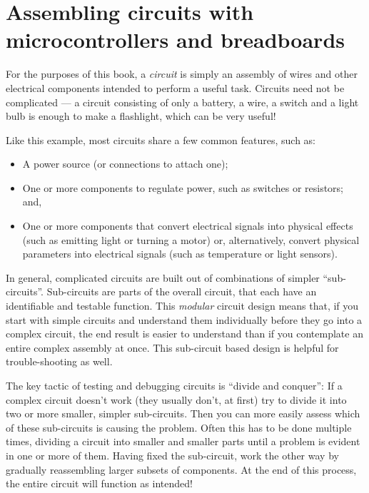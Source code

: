 \section{Assembling circuits with microcontrollers and breadboards}
For the purposes of this book, a \emph{circuit} is simply an assembly of wires and other electrical components intended to perform a useful task.
Circuits need not be complicated --- a circuit consisting of only a battery, a wire, a switch and a light bulb is enough to make a flashlight, which can be very useful!

Like this example, most circuits share a few common features, such as:
\begin{itemize}
	 \item A power source (or connections to attach one);
	 \item One or more components to regulate power, such as switches or resistors; and,
	 \item One or more components that convert electrical signals into physical effects (such as emitting light or turning a motor) or, alternatively, convert physical parameters into electrical signals (such as temperature or light sensors).
\end{itemize}

In general, complicated circuits are built out of combinations of simpler ``sub-circuits''. Sub-circuits are parts of the overall circuit, that each have an identifiable and testable function.
This \emph{modular} circuit design means that, if you start with simple circuits and understand them individually before they go into a complex circuit, the end result is easier to understand than if you contemplate an entire complex assembly at once.
This sub-circuit based design is helpful for trouble-shooting as well.
	\begin{kaobox}[frametitle=Divide and conquer!]
		The key tactic of testing and debugging circuits is ``divide and conquer'':
		If a complex circuit doesn't work (they usually don't, at first) try to divide it into two or more smaller, simpler sub-circuits.
		Then you can more easily assess which of these sub-circuits is causing the problem.
		Often this has to be done multiple times, dividing a circuit into smaller and smaller parts until a problem is evident in one or more of them.
		Having fixed the sub-circuit, work the other way by gradually reassembling larger subsets of components.
		At the end of this process, the entire circuit will function as intended!
	\end{kaobox}

